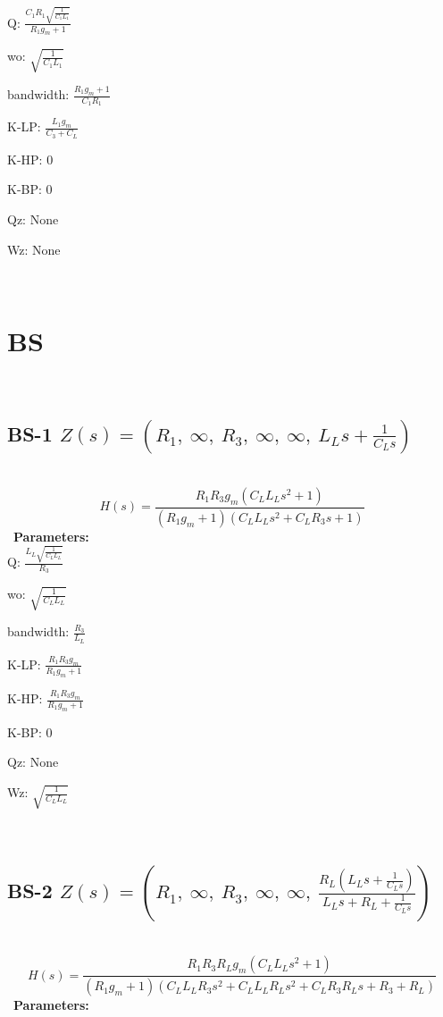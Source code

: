 \documentclass{article}
\begin{document}
Q: $\frac{C_{1} R_{1} \sqrt{\frac{1}{C_{1} L_{1}}}}{R_{1} g_{m} + 1}$\ 

wo: $\sqrt{\frac{1}{C_{1} L_{1}}}$\ 

bandwidth: $\frac{R_{1} g_{m} + 1}{C_{1} R_{1}}$\ 

K-LP: $\frac{L_{1} g_{m}}{C_{3} + C_{L}}$\ 

K-HP: $0$\ 

K-BP: $0$\ 

Qz: $\text{None}$\ 

Wz: $\text{None}$\ 

\ 

\section{BS}\ 
\subsection{BS-1 $Z(s) = \left( R_{1}, \  \infty, \  R_{3}, \  \infty, \  \infty, \  L_{L} s + \frac{1}{C_{L} s}\right)$ } \ 
\textbf{\[H(s) = \frac{R_{1} R_{3} g_{m} \left(C_{L} L_{L} s^{2} + 1\right)}{\left(R_{1} g_{m} + 1\right) \left(C_{L} L_{L} s^{2} + C_{L} R_{3} s + 1\right)}\] } \ 
\textbf{Parameters:}\\ 

Q: $\frac{L_{L} \sqrt{\frac{1}{C_{L} L_{L}}}}{R_{3}}$\ 

wo: $\sqrt{\frac{1}{C_{L} L_{L}}}$\ 

bandwidth: $\frac{R_{3}}{L_{L}}$\ 

K-LP: $\frac{R_{1} R_{3} g_{m}}{R_{1} g_{m} + 1}$\ 

K-HP: $\frac{R_{1} R_{3} g_{m}}{R_{1} g_{m} + 1}$\ 

K-BP: $0$\ 

Qz: $\text{None}$\ 

Wz: $\sqrt{\frac{1}{C_{L} L_{L}}}$\ 

\ 

\subsection{BS-2 $Z(s) = \left( R_{1}, \  \infty, \  R_{3}, \  \infty, \  \infty, \  \frac{R_{L} \left(L_{L} s + \frac{1}{C_{L} s}\right)}{L_{L} s + R_{L} + \frac{1}{C_{L} s}}\right)$ } \ 
\textbf{\[H(s) = \frac{R_{1} R_{3} R_{L} g_{m} \left(C_{L} L_{L} s^{2} + 1\right)}{\left(R_{1} g_{m} + 1\right) \left(C_{L} L_{L} R_{3} s^{2} + C_{L} L_{L} R_{L} s^{2} + C_{L} R_{3} R_{L} s + R_{3} + R_{L}\right)}\] } \ 
\textbf{Parameters:}\\ 
\end{document}
